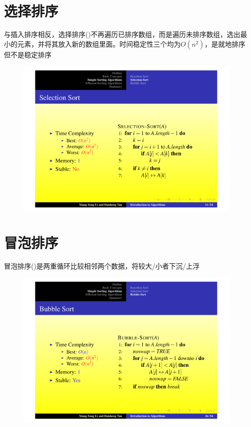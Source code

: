 \documentclass[]{report}
\begin{document}
	\section{选择排序}
		与插入排序相反，选择排序({})不再遍历已排序数组，而是遍历未排序数组，选出最小的元素，并将其放入新的数组里面。时间稳定性三个均为$O(n^2)$，是就地排序但不是稳定排序
		\begin{figure}[h!]
			\centering
			\begin{minipage}{40em}
				\centering
				\includegraphics[scale = 0.45]{images/Selection_Sort.pdf}
			\end{minipage}
		\end{figure}
	\section{冒泡排序}
		冒泡排序({})是两重循环比较相邻两个数据，将较大/小者下沉/上浮
		\begin{figure}[h!]
			\centering
			\begin{minipage}{40em}
				\centering
				\includegraphics[scale = 0.45]{images/Bubble_Sort.pdf}
			\end{minipage}
		\end{figure}
\end{document}

